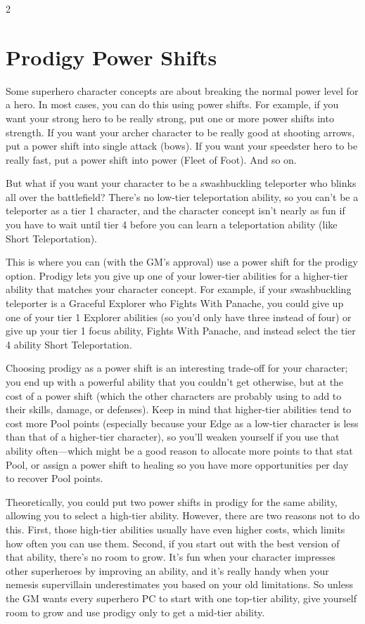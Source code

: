 \begin{multicols}{2}
\section{Prodigy Power Shifts}

Some superhero character concepts are about breaking the normal power level for a hero. In most cases, you can do this using power shifts. For example, if you want your strong hero to be really strong, put one or more power shifts into strength. If you want your archer character to be really good at shooting arrows, put a power shift into single attack (bows). If you want your speedster hero to be really fast, put a power shift into power (Fleet of Foot). And so on.

But what if you want your character to be a swashbuckling teleporter who blinks all over the battlefield? There’s no low-tier teleportation ability, so you can’t be a teleporter as a tier 1 character, and the character concept isn’t nearly as fun if you have to wait until tier 4 before you can learn a teleportation ability (like Short Teleportation).

This is where you can (with the GM’s approval) use a power shift for the prodigy option. Prodigy lets you give up one of your lower-tier abilities for a higher-tier ability that matches your character concept. For example, if your swashbuckling teleporter is a Graceful Explorer who Fights With Panache, you could give up one of your tier 1 Explorer abilities (so you’d only have three instead of four) or give up your tier 1 focus ability, Fights With Panache, and instead select the tier 4 ability Short Teleportation.

Choosing prodigy as a power shift is an interesting trade-off for your character; you end up with a powerful ability that you couldn’t get otherwise, but at the cost of a power shift (which the other characters are probably using to add to their skills, damage, or defenses). Keep in mind that higher-tier abilities tend to cost more Pool points (especially because your Edge as a low-tier character is less than that of a higher-tier character), so you’ll weaken yourself if you use that ability often—which might be a good reason to allocate more points to that stat Pool, or assign a power shift to healing so you have more opportunities per day to recover Pool points.

Theoretically, you could put two power shifts in prodigy for the same ability, allowing you to select a high-tier ability. However, there are two reasons not to do this. First, those high-tier abilities usually have even higher costs, which limits how often you can use them. Second, if you start out with the best version of that ability, there’s no room to grow. It’s fun when your character impresses other superheroes by improving an ability, and it’s really handy when your nemesis supervillain underestimates you based on your old limitations. So unless the GM wants every superhero PC to start with one top-tier ability, give yourself room to grow and use prodigy only to get a mid-tier ability.


\end{multicols}
